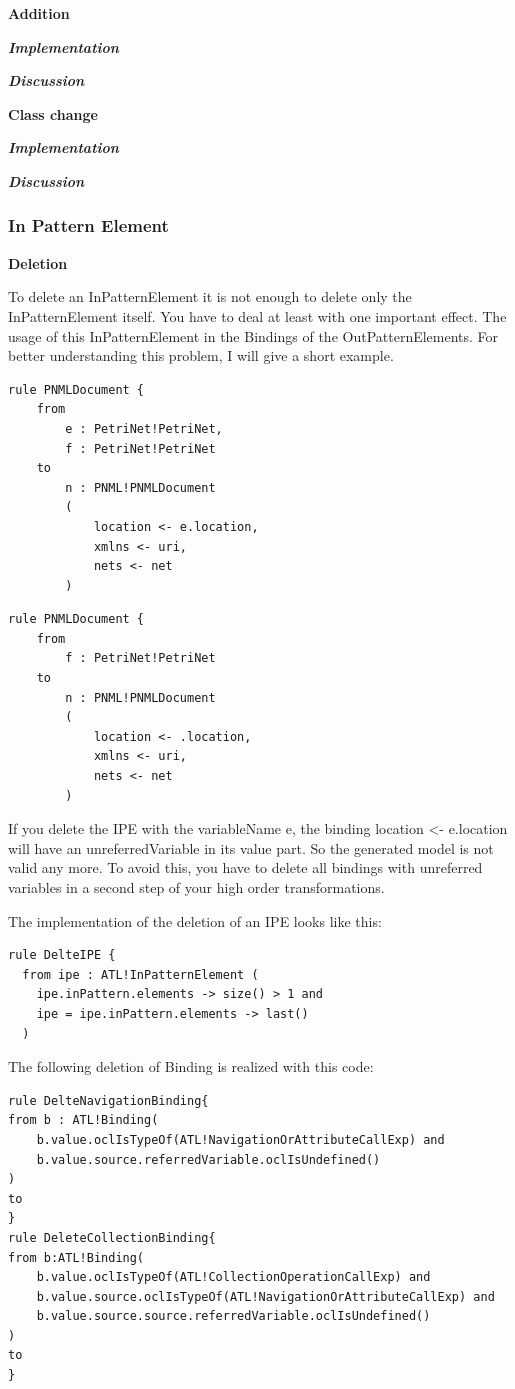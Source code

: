 \documentclass{llncs}
\begin{document}
\textbf{Addition}

\textbf\textit{{Implementation}}

\textbf\textit{{Discussion}}

\textbf{Class change}

\textbf\textit{{Implementation}}

\textbf\textit{{Discussion}}

\subsubsection{In Pattern Element}

\textbf{Deletion}

To delete an InPatternElement it is not enough to delete only the InPatternElement itself. You have to deal at least with one important effect. The usage of this InPatternElement in the Bindings of the OutPatternElements.
For better understanding this problem, I will give a short example.

\begin{lstlisting}
rule PNMLDocument {
	from
		e : PetriNet!PetriNet,
		f : PetriNet!PetriNet
	to	
		n : PNML!PNMLDocument
		(
			location <- e.location,
			xmlns <- uri,
			nets <- net			
		)
\end{lstlisting}

\begin{lstlisting}
rule PNMLDocument {
	from
		f : PetriNet!PetriNet
	to	
		n : PNML!PNMLDocument
		(
			location <- .location,
			xmlns <- uri,
			nets <- net			
		)
\end{lstlisting}

If you delete the IPE with the variableName e, the binding location <- e.location will have an unreferredVariable in its value part. So the generated model is not valid any more. To avoid this, you have to delete all bindings with unreferred variables in a second step of your high order transformations.

The implementation of the deletion of an IPE looks like this:
\begin{lstlisting}
rule DelteIPE {
  from ipe : ATL!InPatternElement (
    ipe.inPattern.elements -> size() > 1 and
    ipe = ipe.inPattern.elements -> last()
  )
\end{lstlisting}

The following deletion of Binding is realized with this code:
\begin{lstlisting}
rule DelteNavigationBinding{
from b : ATL!Binding(
	b.value.oclIsTypeOf(ATL!NavigationOrAttributeCallExp) and 
	b.value.source.referredVariable.oclIsUndefined()
)
to
}
rule DeleteCollectionBinding{
from b:ATL!Binding(		
	b.value.oclIsTypeOf(ATL!CollectionOperationCallExp) and 
	b.value.source.oclIsTypeOf(ATL!NavigationOrAttributeCallExp) and 
	b.value.source.source.referredVariable.oclIsUndefined()
)
to
}
\end{lstlisting}
\end{document}
